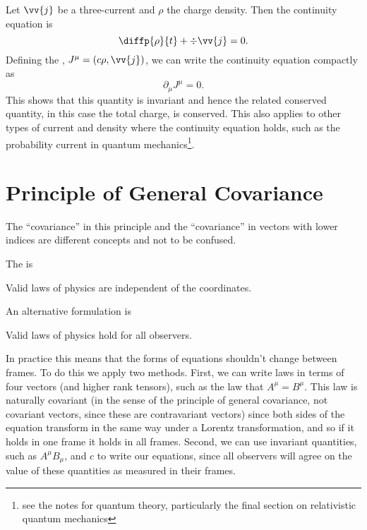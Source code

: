 \documentclass[fleqn]{NotesClass}
\begin{document}
    Let \(\vv{j}\) be a three-current and \(\rho\) the charge density.
    Then the continuity equation is
    \begin{equation}
        \diffp{\rho}{t} + \div \vv{j} = 0.
    \end{equation}
    Defining the , \(J^\mu = (c\rho, \vv{j})\), we can write the continuity equation compactly as
    \begin{equation}
        \partial_\mu J^\mu = 0.
    \end{equation}
    This shows that this quantity is invariant and hence the related conserved quantity, in this case the total charge, is conserved.
    This also applies to other types of current and density where the continuity equation holds, such as the probability current in quantum mechanics\footnote{see the notes for quantum theory, particularly the final section on relativistic quantum mechanics}.
    
    \section{Principle of General Covariance}
    \begin{rmk}
        The \enquote{covariance} in this principle and the \enquote{covariance} in vectors with lower indices are different concepts and not to be confused.
    \end{rmk}
    The  is
    \begin{important}
        Valid laws of physics are independent of the coordinates.
    \end{important}
    An alternative formulation is
    \begin{important}
        Valid laws of physics hold for all observers.
    \end{important}
    
    In practice this means that the forms of equations shouldn't change between frames.
    To do this we apply two methods.
    First, we can write laws in terms of four vectors (and higher rank tensors), such as the law that \(A^\mu = B^\mu\).
    This law is naturally covariant (in the sense of the principle of general covariance, not covariant vectors, since these are contravariant vectors) since both sides of the equation transform in the same way under a Lorentz transformation, and so if it holds in one frame it holds in all frames.
    Second, we can use invariant quantities, such as \(A^\mu B_\mu\), and \(c\) to write our equations, since all observers will agree on the value of these quantities as measured in their frames.
    
\end{document}
